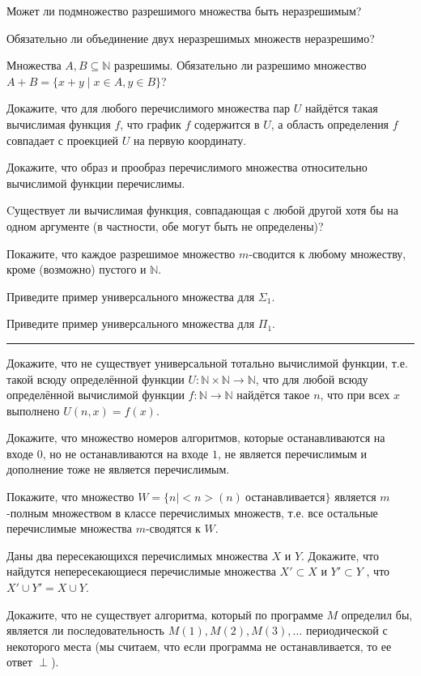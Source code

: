 \z Может ли подмножество разрешимого множества быть неразрешимым?

\z Обязательно ли объединение двух неразрешимых множеств неразрешимо?

\z Множества $A, B \subseteq \mathbb{N}$ разрешимы. Обязательно ли разрешимо множество $A + B = \{x + y
\mid x \in A, y \in B\}$? 

\z Докажите, что для любого перечислимого множества пар $U$ найдётся такая вычислимая функция $f$, что
график $f$ содержится в $U$, а область определения $f$ совпадает с проекцией $U$ на первую координату. 

\z Докажите, что образ и прообраз перечислимого множества относительно вычислимой функции перечислимы.


\z Cуществует ли вычислимая функция, совпадающая с любой другой хотя бы на одном аргументе (в частности,
обе могут быть не определены)?

\z Покажите, что каждое разрешимое множество $m$-сводится к любому множеству, кроме (возможно) 
пустого и $\mathbb{N}$.

\z Приведите пример универсального множества для $\Sigma_1$.

\z Приведите пример универсального множества для $\Pi_1$.

\hrule


\z Докажите, что не существует универсальной тотально вычислимой функции, т.е. такой всюду определённой
функции $U:\mathbb{N} \times \mathbb{N} \to \mathbb{N}$, что для любой всюду определённой вычислимой
функции $f:\mathbb{N} \to \mathbb{N}$ найдётся такое $n$, что при всех $x$ выполнено $U(n, x) = f(x)$.

\z Докажите, что множество номеров алгоритмов, которые останавливаются на входе $0$, но не останавливаются
на входе $1$, не является перечислимым и дополнение тоже не является перечислимым.

\z Покажите, что множество $W = \{n \mid {<}n{>}(n)~\text{останавливается}\}$ является $m$-полным множеством
в классе перечислимых множеств, т.е. все остальные перечислимые множества $m$-сводятся к $W$.

\z Даны два пересекающихся перечислимых множества $X$ и $Y$. Докажите, что найдутся непересекающиеся
перечислимые множества $X' \subset X$ и $Y' \subset Y$ , что $X' \cup Y' = X \cup Y$.

\z Докажите, что не существует алгоритма, который по программе $M$ определил бы, является
ли последовательность $M(1) ,M(2), M(3), \dots$ периодической с некоторого места 
(мы считаем, что если программа не останавливается, то ее ответ $\perp$).

